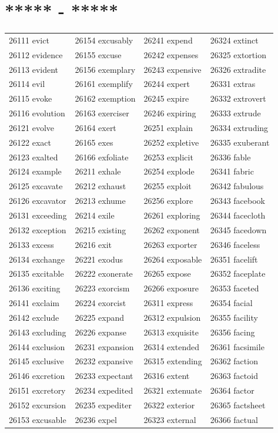 \documentclass[10pt, oneside]{book}
\begin{document}
\begin{table}
	\centering
	\section*{***** - *****}
	\begin{tabular}{l l l l}
26111 evict &26154 excusably &26241 expend &26324 extinct\\
26112 evidence &26155 excuse &26242 expenses &26325 extortion\\
26113 evident &26156 exemplary &26243 expensive &26326 extradite\\
26114 evil &26161 exemplify &26244 expert &26331 extras\\
26115 evoke &26162 exemption &26245 expire &26332 extrovert\\
26116 evolution &26163 exerciser &26246 expiring &26333 extrude\\
26121 evolve &26164 exert &26251 explain &26334 extruding\\
26122 exact &26165 exes &26252 expletive &26335 exuberant\\
26123 exalted &26166 exfoliate &26253 explicit &26336 fable\\
26124 example &26211 exhale &26254 explode &26341 fabric\\
26125 excavate &26212 exhaust &26255 exploit &26342 fabulous\\
26126 excavator &26213 exhume &26256 explore &26343 facebook\\
26131 exceeding &26214 exile &26261 exploring &26344 facecloth\\
26132 exception &26215 existing &26262 exponent &26345 facedown\\
26133 excess &26216 exit &26263 exporter &26346 faceless\\
26134 exchange &26221 exodus &26264 exposable &26351 facelift\\
26135 excitable &26222 exonerate &26265 expose &26352 faceplate\\
26136 exciting &26223 exorcism &26266 exposure &26353 faceted\\
26141 exclaim &26224 exorcist &26311 express &26354 facial\\
26142 exclude &26225 expand &26312 expulsion &26355 facility\\
26143 excluding &26226 expanse &26313 exquisite &26356 facing\\
26144 exclusion &26231 expansion &26314 extended &26361 facsimile\\
26145 exclusive &26232 expansive &26315 extending &26362 faction\\
26146 excretion &26233 expectant &26316 extent &26363 factoid\\
26151 excretory &26234 expedited &26321 extenuate &26364 factor\\
26152 excursion &26235 expediter &26322 exterior &26365 factsheet\\
26153 excusable &26236 expel &26323 external &26366 factual\\
	\end{tabular}
 \end{table}
\end{document}
